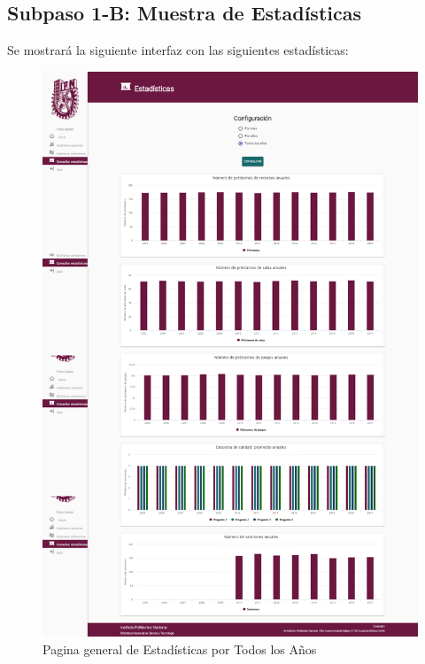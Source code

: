 \subsection{Subpaso 1-B: Muestra de Estadísticas}
	Se mostrará la siguiente interfaz con las siguientes estadísticas:
	\begin{figure}[hbtp]
		\includegraphics[scale=0.3]{images/Interfaz/IUGS15_estadisticasTodos.PNG}
		\caption{Pagina general de Estadísticas por Todos los Años}
	\end{figure}	
	
